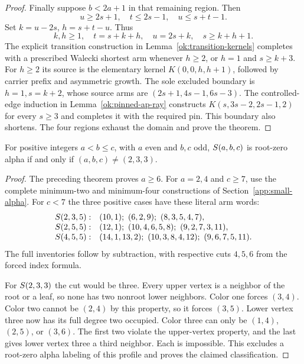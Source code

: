 \begin{proof}
Finally suppose $b<2a+1$ in that remaining region.  Then
\[
 u\ge2s+1,\quad t\le2s-1,\quad u\le s+t-1.
\]
Set $k=u-2s$, $h=s+t-u$.  Thus
\[
 k,h\ge1,\quad t=s+k+h,\quad u=2s+k,\quad s\ge k+h+1.
\]
The explicit transition construction in
Lemma~\ref{ok:transition-kernels} completes with a prescribed
Walecki shortest arm whenever $h\ge2$, or $h=1$ and
$s\ge k+3$.  For $h\ge2$ its source is the elementary kernel
$K(0,0,h,h+1)$, followed by carrier prefix and asymmetric growth.
The sole excluded boundary is $h=1,s=k+2$, whose source arms
are $(2s+1,4s-1,6s-3)$.
The controlled-edge induction in Lemma~\ref{ok:pinned-ap-ray}
constructs $K(s,3s-2,2s-1,2)$ for every $s\ge3$ and
completes it with the required pin.  This boundary also shortens.
The four regions exhaust the domain and prove the theorem.
\end{proof}

\begin{theorem}\label{mc:all-eoo}
For positive integers $a<b\le c$, with $a$ even and $b,c$ odd,
$S\!\left(a,b,c\right)$ is root-zero alpha if and only if
$(a,b,c)\ne(2,3,3)$.
\end{theorem}
\begin{proof}
The preceding theorem proves $a\ge6$.
For $a=2,4$ and $c\ge7$, use the complete minimum-two and
minimum-four constructions of Section~\ref{app:small-alpha}.
For $c<7$ the three positive cases have these literal arm words:
\[
\begin{array}{ll}
S\!\left(2,3,5\right):&(10,1);\ (6,2,9);\ (8,3,5,4,7),\\
S\!\left(2,5,5\right):&(12,1);\ (10,4,6,5,8);\ (9,2,7,3,11),\\
S\!\left(4,5,5\right):&(14,1,13,2);\ (10,3,8,4,12);\ (9,6,7,5,11).
\end{array}
\]
The full inventories follow by subtraction, with respective cuts
$4,5,6$ from the forced index formula.

For $S\!\left(2,3,3\right)$ the cut would be three.
Every upper vertex is a neighbor of the root or a leaf, so none has
two nonroot lower neighbors.  Color one forces $(3,4)$.
Color two cannot be $(2,4)$ by this property, so it forces $(3,5)$.
Lower vertex three now has its full degree two occupied.
Color three can only be $(1,4)$, $(2,5)$, or $(3,6)$.
The first two violate the upper-vertex property, and the last gives
lower vertex three a third neighbor.  Each is impossible.
This excludes a root-zero alpha labeling of this profile and proves
the claimed classification.
\end{proof}

